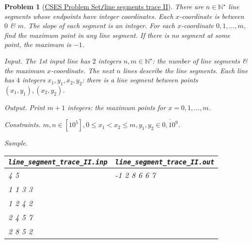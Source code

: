 \documentclass{article}
\newtheorem{problem}{Problem}
\begin{document}
\begin{problem}[\href{https://cses.fi/problemset/task/3428}{CSES Problem Set{\tt/}line segments trace II}]
    There are $n\in\mathbb{N}^\star$ line segments whose endpoints have integer coordinates. Each $x$-coordinate is between $0$ \& $m$. The slope of each segment is an integer. For each $x$-coordinate $0,1,\ldots,m$, find the maximum point in any line segment. If there is no segment at some point, the maximum is $-1$.
    \item {\sf Input.} The 1st input line has $2$ integers $n,m\in\mathbb{N}^\star$: the number  of line segments \& the maximum $x$-coordinate. The next $n$ lines describe the line segments. Each line has $4$ integers $x_1,y_1,x_2,y_2$: there is a line segment between points $(x_1,y_1),(x_2,y_2)$.
    \item {\sf Output.} Print $m + 1$ integers: the maximum points for $x = 0,1,\ldots,m$.
    \item {\sf Constraints.} $m,n\in[10^5],0\le x_1 < x_2\le m,y_1,y_2\in\overline{0,10^9}$.
    \item {\sf Sample.}
    \begin{table}[H]
        \centering
        \begin{tabular}{|l|l|}
            \hline
            \verb|line_segment_trace_II.inp| & \verb|line_segment_trace_II.out| \\
            \hline
            4 5 & -1 2 8 6 6 7 \\
            1 1 3 3 & \\
            1 2 4 2 & \\
            2 4 5 7 & \\
            2 8 5 2 & \\
            \hline
        \end{tabular}
    \end{table}
\end{problem}
\end{document}
